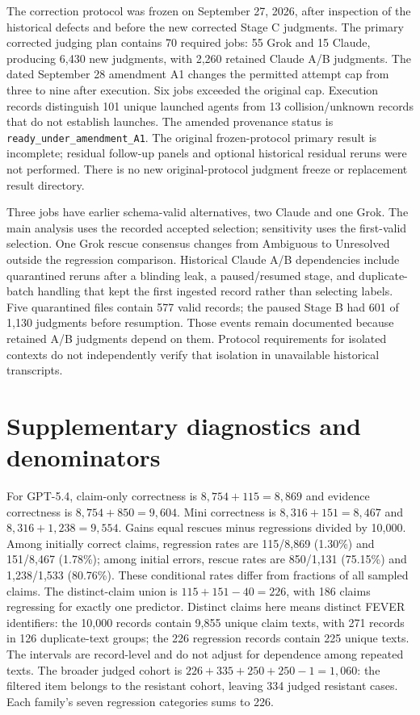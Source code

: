 \documentclass[11pt,letterpaper]{article}
\begin{document}
The correction protocol was frozen on September 27, 2026, after inspection of the historical defects and before the new corrected Stage C judgments. The primary corrected judging plan contains 70 required jobs: 55 Grok and 15 Claude, producing 6,430 new judgments, with 2,260 retained Claude A/B judgments. The dated September 28 amendment A1 changes the permitted attempt cap from three to nine after execution. Six jobs exceeded the original cap. Execution records distinguish 101 unique launched agents from 13 collision/unknown records that do not establish launches. The amended provenance status is \texttt{ready\_under\_amendment\_A1}. The original frozen-protocol primary result is incomplete; residual follow-up panels and optional historical residual reruns were not performed. There is no new original-protocol judgment freeze or replacement result directory.

Three jobs have earlier schema-valid alternatives, two Claude and one Grok. The main analysis uses the recorded accepted selection; sensitivity uses the first-valid selection. One Grok rescue consensus changes from Ambiguous to Unresolved outside the regression comparison. Historical Claude A/B dependencies include quarantined reruns after a blinding leak, a paused/resumed stage, and duplicate-batch handling that kept the first ingested record rather than selecting labels. Five quarantined files contain 577 valid records; the paused Stage B had 601 of 1,130 judgments before resumption. Those events remain documented because retained A/B judgments depend on them. Protocol requirements for isolated contexts do not independently verify that isolation in unavailable historical transcripts.

\section{Supplementary diagnostics and denominators}\label{app:supplement}
For GPT-5.4, claim-only correctness is $8,754+115=8,869$ and evidence correctness is $8,754+850=9,604$. Mini correctness is $8,316+151=8,467$ and $8,316+1,238=9,554$. Gains equal rescues minus regressions divided by 10,000. Among initially correct claims, regression rates are 115/8,869 (1.30\%) and 151/8,467 (1.78\%); among initial errors, rescue rates are 850/1,131 (75.15\%) and 1,238/1,533 (80.76\%). These conditional rates differ from fractions of all sampled claims. The distinct-claim union is $115+151-40=226$, with 186 claims regressing for exactly one predictor. Distinct claims here means distinct FEVER identifiers: the 10,000 records contain 9,855 unique claim texts, with 271 records in 126 duplicate-text groups; the 226 regression records contain 225 unique texts. The intervals are record-level and do not adjust for dependence among repeated texts. The broader judged cohort is $226+335+250+250-1=1,060$: the filtered item belongs to the resistant cohort, leaving 334 judged resistant cases. Each family's seven regression categories sums to 226.
\end{document}
